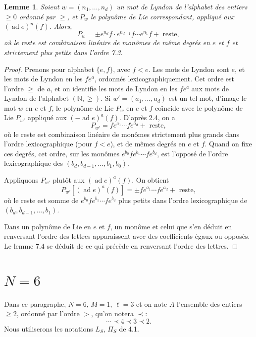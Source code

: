 \documentclass[11pt,a4paper]{article}
\theoremstyle{plain}
\newtheorem{lemma}[theorem]{Lemme}
\theoremstyle{definition}
\DeclareMathOperator{\ad}{ad}
\newcommand{\N}{\mathbb{N}}
\begin{document}
\begin{lemma}\label{lem:7.4}
Soient $w = (n_1,\ldots,n_d)$ un mot de Lyndon de l'alphabet des entiers $\geq 0$ ordonn\'e par $\geq$, et $P_w$ le polyn\^ome de Lie correspondant, appliqu\'e aux $(\ad e)^n(f)$. Alors,
\begin{equation}\label{eq:7.4.1}
P_w = \pm e^{n_d}f \cdot e^{n_{d-1}}f \cdots e^{n_1}f + \text{ reste},
\end{equation}
o\`u le reste est combinaison lin\'eaire de mon\^omes de m\^eme degr\'es en $e$ et $f$ et strictement plus petits dans l'ordre 7.3.
\end{lemma}

\begin{proof}
Prenons pour alphabet $\{e, f\}$, avec $f < e$. Les mots de Lyndon sont $e$, et les mots de Lyndon en les $fe^a$, ordonn\'es lexicographiquement. Cet ordre est l'ordre $\geq$ de $a$, et on identifie les mots de Lyndon en les $fe^a$ aux mots de Lyndon de l'alphabet $(\N, \geq)$. Si $w' = (a_1,\ldots,a_d)$ est un tel mot, d'image le mot $w$ en $e$ et $f$, le polyn\^ome de Lie $P_w$ en $e$ et $f$ co\"{\i}ncide avec le polyn\^ome de Lie $P_{w'}$ appliqu\'e aux $(-\ad e)^a(f)$. D'apr\`es 2.4, on a
\[
P_{w'} = fe^{a_1} \cdots fe^{a_d} + \text{ reste},
\]
o\`u le reste est combinaison lin\'eaire de mon\^omes strictement plus grands dans l'ordre lexicographique (pour $f < e$), et de m\^emes degr\'es en $e$ et $f$. Quand on fixe ces degr\'es, cet ordre, sur les mon\^omes $e^{b_0}fe^{b_1} \cdots fe^{b_d}$, est l'oppos\'e de l'ordre lexicographique des $(b_d, b_{d-1},\ldots, b_1, b_0)$.

Appliquons $P_{w'}$ plut\^ot aux $(\ad e)^a(f)$. On obtient
\[
P_{w'}[(\ad e)^a(f)] = \pm fe^{a_1} \cdots fe^{a_d} + \text{ reste},
\]
o\`u le reste est somme de $e^{b_0}fe^{b_1} \cdots fe^{b_d}$ plus petits dans l'ordre lexicographique de $(b_d, b_{d-1},\ldots, b_1)$.

Dans un polyn\^ome de Lie en $e$ et $f$, un mon\^ome et celui que s'en d\'eduit en renversant l'ordre des lettres apparaissent avec des coefficients \'egaux ou oppos\'es. Le lemme 7.4 se d\'eduit de ce qui pr\'ec\`ede en renversant l'ordre des lettres.
\end{proof}

\section{$N=6$}
\label{sec:8}

Dans ce paragraphe, $N=6$, $M=1$, $\ell = 3$ et on note $A$ l'ensemble des entiers $\geq 2$, ordonn\'e par l'ordre $>$, qu'on notera $\prec$:
\[
\cdots \prec 4 \prec 3 \prec 2.
\]
Nous utiliserons les notations $L_S$, $\Pi_S$ de 4.1.
\end{document}
